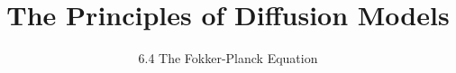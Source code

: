 
\title{The Principles of Diffusion Models}
\subtitle{6.4 The Fokker-Planck Equation}


\begin{frame}
    \titlepage
\end{frame}


